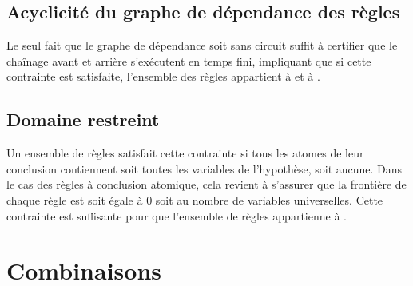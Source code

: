 \subsection{Acyclicité du graphe de dépendance des règles}\label{classe_agrd}
Le seul fait que le graphe de dépendance soit sans circuit suffit à certifier que le chaînage
avant et arrière s'exécutent en temps fini, impliquant que si cette contrainte est satisfaite,
l'ensemble des règles appartient à \fes et à \fus.

\subsection{Domaine restreint}\label{classe_dr}
Un ensemble de règles satisfait cette contrainte si tous les atomes de leur conclusion
contiennent soit toutes les variables de l'hypothèse, soit aucune.
Dans le cas des règles à conclusion atomique, cela revient à s'assurer que la frontière
de chaque règle est soit égale à 0 soit au nombre de variables universelles.
Cette contrainte est suffisante pour que l'ensemble de règles appartienne à \fus.


\section{Combinaisons}\label{combine}

